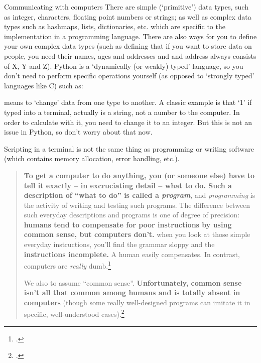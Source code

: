 \documentclass[10pt]{beamer}
\begin{document}
\begin{frame}[allowframebreaks]{Communicating with computers}
There are simple (`primitive') data types, such as integer, characters, floating point numbers or strings; as well as complex data types such as hashmaps, lists, dictionaries, etc. which are specific to the implementation in a programming language. There are also ways for you to define your own complex data types (such as defining that if you want to store data on people, you need their names, ages and addresses and and address always consists of X, Y and Z).
Python is a `dynamically (or weakly) typed' language, so you don't need to perform specific operations yourself (as opposed to `strongly typed' languages like C) such as:

 means to `change' data from one type to another. A classic example is that `1' if typed into a terminal, actually is a string, not a number to the computer. In order to calculate with it, you need to change it to an integer. But this is not an issue in Python, so don't worry about that now.

 Scripting in a terminal is not the same thing as programming or writing software (which contains memory allocation, error handling, etc.). 

\begin{quote}\footnotesize
    \textbf{To get a computer to do anything, you (or someone else) have to tell it exactly -- in excruciating detail -- what to do. Such a description of ``what to do'' is called a \emph{program}}, and \emph{programming} is the activity of writing and testing such programs.
    \punkti The difference between such \lbrack{}everyday\rbrack{} descriptions and programs is one of degree of precision: \textbf{humans tend to compensate for poor instructions by using common sense, but computers don't.}
    \punkti when you look at those simple \lbrack{}everyday\rbrack{} instructions, you'll find the grammar sloppy and the \textbf{instructions incomplete.} A human easily compensates. \punkti In contrast, computers are \emph{really} dumb.\footcite[][44. Hervorhebung hinzugefügt.]{stroustrup}
    
    We also \punkti to assume ``common sense''. \textbf{Unfortunately, common sense isn't all that common among humans and is totally absent in computers} (though some really well-designed programs can imitate it in specific, well-understood cases).\footcite[35. Emphasis added.]{stroustrup}
\end{quote}
\end{frame}
\end{document}
